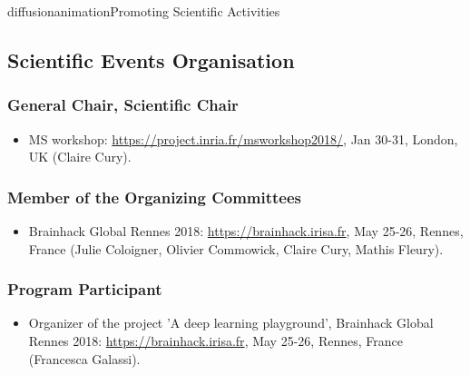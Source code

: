 \documentclass{ra2018}
\begin{document}


\begin{module}{diffusion}{animation}{Promoting Scientific Activities}



\subsection{Scientific Events Organisation}
    \subsubsection{General Chair, Scientific Chair}
    \begin{itemize}
        \item MS workshop: \url{https://project.inria.fr/msworkshop2018/}, Jan 30-31, London, UK (Claire Cury).
    \end{itemize}    

    

    \subsubsection{Member of the Organizing Committees}
    \begin{itemize}
        \item Brainhack Global Rennes 2018: \url{https://brainhack.irisa.fr}, May 25-26, Rennes, France (Julie Coloigner, Olivier Commowick, Claire Cury, Mathis Fleury).
    \end{itemize}    
    \subsubsection{Program Participant}
    \begin{itemize}
        \item Organizer of the project 'A deep learning playground', Brainhack Global Rennes 2018: \url{https://brainhack.irisa.fr}, May 25-26, Rennes, France (Francesca Galassi).
    \end{itemize}  

\end{module}
\end{document}
